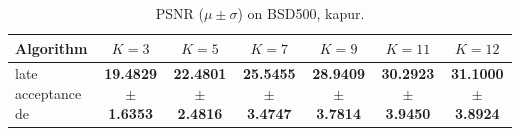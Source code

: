 \begin{table}[htbp]
\centering
\caption{PSNR ($\mu \pm \sigma$) on BSD500, kapur.}
\label{tab:exp1-kapur-psnr}
\begin{tabular}{lcccccc}
\toprule
Algorithm & $K=3$ & $K=5$ & $K=7$ & $K=9$ & $K=11$ & $K=12$ \\
\midrule
late acceptance de & \textbf{19.4829 $\pm$ 1.6353} & \textbf{22.4801 $\pm$ 2.4816} & \textbf{25.5455 $\pm$ 3.4747} & \textbf{28.9409 $\pm$ 3.7814} & \textbf{30.2923 $\pm$ 3.9450} & \textbf{31.1000 $\pm$ 3.8924} \\
\bottomrule
\end{tabular}
\end{table}